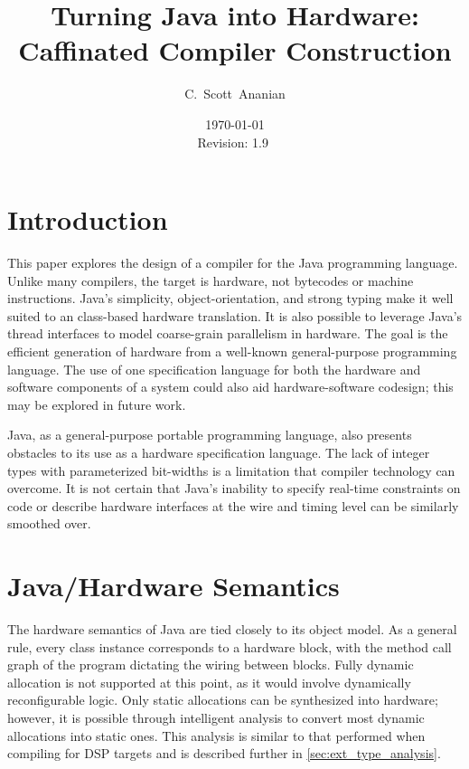 \documentclass[11pt,notitlepage,twocolumn]{article}
\author{C.~Scott~Ananian}
\title{Turning Java into Hardware: \\ Caffinated Compiler Construction}
\date{\today \\ $ $Revision: 1.9 $ $}
\begin{document}

\maketitle

\section{Introduction}
This paper explores the design of a compiler for the Java
programming language.  Unlike many compilers, the target is hardware,
not bytecodes or machine instructions.
Java's simplicity, object-orientation, and
strong typing make it well suited to an class-based hardware
translation.  It is also possible to leverage Java's thread interfaces
to model coarse-grain parallelism in hardware.  The goal is the
efficient generation of hardware from a well-known general-purpose
programming language.  The use of one specification language for both
the hardware and software components of a system could also aid
hardware-software codesign; this may be explored in future work.

Java, as a general-purpose portable programming language, also
presents obstacles to its use as a hardware specification language.
The lack of integer types with parameterized bit-widths is a
limitation that compiler technology can overcome.  It is not certain
that Java's inability to specify real-time constraints on code or
describe hardware interfaces at the wire and timing level can be
similarly smoothed over.

\section{Java/Hardware Semantics}
The hardware semantics of Java are tied closely to its object model.
As a general rule, every class instance corresponds to a hardware
block, with the method call graph of the program dictating the wiring
between blocks.  Fully dynamic allocation is not supported at this
point, as it would involve dynamically reconfigurable logic.  Only
static allocations can be synthesized into hardware; however, it is
possible through intelligent analysis to convert most dynamic
allocations into static ones.  This analysis is similar to that
performed when compiling for DSP targets \cite{DSP_targets} and is
described further in \ref{sec:ext_type_analysis}.
\end{document}

